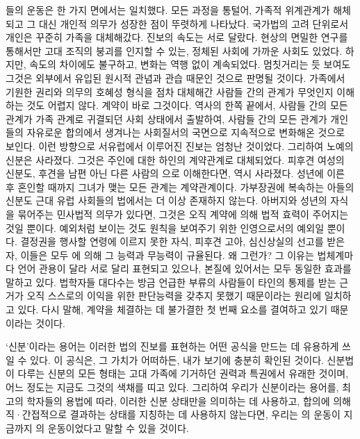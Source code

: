 들의 운동은 한 가지 면에서는 일치했다.
모든 과정을 통털어, 가족적 위계관계가 해체되고 그 대신 개인적 의무가
성장한 점이 뚜렷하게 나타났다.
국가법의 고려 단위로서
개인은 꾸준히 가족을 대체해갔다.
진보의 속도는 서로 달랐다.
현상의 면밀한 연구를 통해서만
고대 조직의 붕괴를 인지할 수 있는,
정체된 사회에 가까운 사회도 있었다.
하지만,
속도의 차이에도 불구하고,
변화는 역행 없이 계속되었다.
멈칫거리는 듯 보여도 그것은 외부에서 유입된 원시적 관념과 관습 때문인 것으로
판명될 것이다.
가족에서 기원한 권리와 의무의 호혜성 형식을 점차 대체해간
사람들 간의 관계가 무엇인지 이해하는 것도 어렵지 않다.
계약이 바로 그것이다.
역사의 한쪽 끝에서,
사람들 간의 모든 관계가 가족 관계로 귀결되던 사회 상태에서 출발하여,
사람들 간의 모든 관계가 개인들의 자유로운 합의에서 생겨나는
사회질서의 국면으로
지속적으로 변화해온 것으로 보인다.
이런 방향으로
서유럽에서
이루어진 진보는 엄청난 것이었다.
그리하여 노예의 신분은 사라졌다.
그것은 주인에 대한 하인의 계약관계로 대체되었다.
피후견 여성의 신분도,
후견을 남편 아닌 다른 사람의 으로 이해한다면,
역시 사라졌다.
성년에 이른 후 혼인할 때까지 그녀가 맺는 모든 관계는 계약관계이다.
가부장권에 복속하는 아들의 신분도 근대 유럽 사회들의 법에서는
더 이상 존재하지 않는다.
아버지와 성년의 자식을 묶어주는 민사법적 의무가 있다면,
그것은 오직 계약에 의해 법적 효력이 주어지는 것일 뿐이다.
예외처럼 보이는 것도 원칙을 보여주기 위한
인영으로서의 예외일 뿐이다.
결정권을 행사할 연령에 이르지 못한 자식,
피후견 고아, 심신상실의 선고를 받은 자,
이들은 모두 에 의해
그 능력과 무능력이 규율된다.
왜 그런가?
그 이유는 법체계마다 언어 관용이 달라 서로 달리 표현되고 있으나,
본질에 있어서는 모두 동일한 효과를 말하고 있다.
법학자들 대다수는
방금 언급한 부류의 사람들이
타인의 통제를 받는 근거가
오직
스스로의 이익을 위한 판단능력을 갖추지 못했기 때문이라는 원리에
일치하고 있다.
다시 말해, 계약을 체결하는 데 불가결한
첫 번째 요소를 결여하고 있기 때문이라는 것이다.

`신분'이라는 용어는
이러한 법의 진보를 표현하는 어떤 공식을 만드는 데
유용하게 쓰일 수 있다.
이 공식은, 그 가치가 어떠하든,
내가 보기에 충분히 확인된 것이다.
신분법이 다루는 신분의 모든 형태는
고대 가족에 기거하던 권력과 특권에서 유래한 것이며,
어느 정도는 지금도 그것의 색채를 띠고 있다.
그리하여 우리가 신분이라는 용어를,
최고의 학자들의 용법에 따라,
이러한 신분 상태만을 의미하는 데 사용하고,
합의에 의해 직·간접적으로 결과하는 상태를
지칭하는 데 사용하지 않는다면,
우리는 의 운동이 지금까지
의 운동이었다고
말할 수 있을 것이다.

